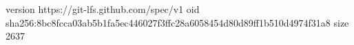 version https://git-lfs.github.com/spec/v1
oid sha256:8bc8fcca03ab5b1fa5ec446027f3ffc28a6058454d80d89ff1b510d4974f31a8
size 2637
